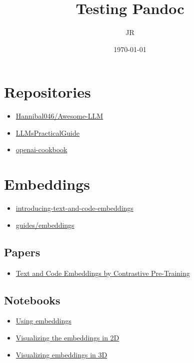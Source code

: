 \documentclass[9pt]{article}
\title{Testing Pandoc}
\author{JR}
\date{\today}
\begin{document}
\maketitle
\tableofcontents
\newpage

\section{Repositories}
\begin{itemize}
  \item \href{https://github.com/Hannibal046/Awesome-LLM}{Hannibal046/Awesome-LLM}
  \item \href{https://github.com/Mooler0410/LLMsPracticalGuide}{LLMsPracticalGuide}
  \item \href{https://github.com/openai/openai-cookbook}{openai-cookbook}
\end{itemize}

\section{Embeddings}
\begin{itemize}
  \item \href{https://openai.com/index/introducing-text-and-code-embeddings/}{introducing-text-and-code-embeddings}
  \item \href{https://platform.openai.com/docs/guides/embeddings}{guides/embeddings}
\end{itemize}


\subsection{Papers}

\begin{itemize}
  \item \href{https://arxiv.org/abs/2201.10005}{Text and Code Embeddings by Contrastive Pre-Training}
\end{itemize}


\subsection{Notebooks}
\begin{itemize}
  \item \href{https://github.com/openai/openai-cookbook/blob/main/examples/Using_embeddings.ipynb}{Using embeddings}
  \item \href{https://github.com/openai/openai-cookbook/blob/main/examples/Visualizing_embeddings_in_2D.ipynb}{Visualizing the embeddings in 2D}
  \item \href{https://github.com/openai/openai-cookbook/blob/main/examples/Visualizing_embeddings_in_3D.ipynb}{Visualizing embeddings in 3D}
\end{itemize}
\end{document}
